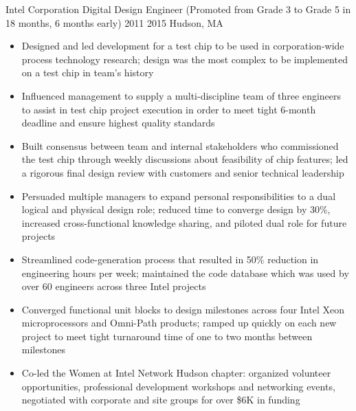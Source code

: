 \documentclass[a4paper,11pt]{business}
\begin{document}
\entry
 {Intel Corporation}
 {Digital Design Engineer (Promoted from Grade 3 to Grade 5 in 18 months, 6 months early)}
 {2011}
 {2015}
 {Hudson, MA}{
 \begin{itemize}
  \item Designed and led development for a test chip to be used in corporation-wide process technology research; design was the most complex to be implemented on a test chip in team’s history
  \item Influenced management to supply a multi-discipline team of three engineers to assist in test chip project execution in order to meet tight 6-month deadline and ensure highest quality standards
  \item Built consensus between team and internal stakeholders who commissioned the test chip through weekly discussions about feasibility of chip features; led a rigorous final design review with customers and senior technical leadership
  \item Persuaded multiple managers to expand personal responsibilities to a dual logical and physical design role; reduced time to converge design by 30\%, increased cross-functional knowledge sharing, and piloted dual role for future projects
  \item Streamlined code-generation process that resulted in 50\% reduction in engineering hours per week; maintained the code database which was used by over 60 engineers across three Intel projects
  \item  Converged functional unit blocks to design milestones across four Intel Xeon microprocessors and Omni-Path products; ramped up quickly on each new project to meet tight turnaround time of one to two months between milestones
  \item Co-led the Women at Intel Network Hudson chapter: organized volunteer opportunities, professional development workshops and networking events, negotiated with corporate and site groups for over \$6K in funding

\end{itemize}}
\end{document}

